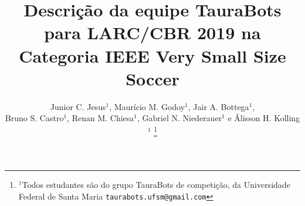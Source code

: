 \title{\LARGE \bf
Descrição da equipe TauraBots para LARC/CBR 2019 na Categoria IEEE Very Small Size Soccer
}





\author{Junior C. Jesus$^{1}$, Maurício M. Godoy$^{1}$, Jair A. Bottega$^{1}$,\\ Bruno S. Castro$^{1}$, Renan M. Chiesa$^{1}$, Gabriel N. Niederauer$^{1}$ e Álisson H. Kolling$^{1}$%
\thanks{$^{1}$Todos estudantes são do grupo TauraBots de competição, da Universidade Federal de Santa Maria
        {\tt\small taurabots.ufsm@gmail.com}}%
}
